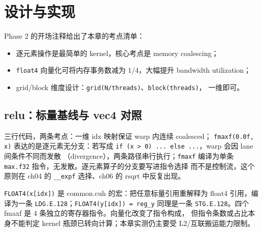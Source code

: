 \section{设计与实现}

Phase 2 的开场注释给出了本章的考点清单：

\begin{itemize}
\item 逐元素操作是最简单的 kernel，核心考点是 memory coalescing；
\item \texttt{float4} 向量化可将内存事务数减为 $1/4$，大幅提升 bandwidth
  utilization；
\item grid/block 维度设计：\texttt{grid(N/threads)}、\texttt{block(threads)}，
  一维即可。
\end{itemize}

\subsection{relu：标量基线与 vec4 对照}



三行代码，两条考点：一维 idx 映射保证 warp 内连续 coalesced；
\texttt{fmaxf(0.0f, x)} 表达的是逐元素无分支：若写成
\texttt{if (x > 0) ... else ...}，warp 会因 lane 间条件不同而发散
（divergence），两条路径串行执行；\texttt{fmaxf} 编译为单条
\texttt{max.f32} 指令，无发散。逐元素算子的分支要写进指令选择
而不是控制流，这个原则在 ch04 的 \texttt{\_\_expf} 选择、ch06 的
rsqrt 中反复出现。



\texttt{FLOAT4\allowbreak{}(x[idx])} 是 common.cuh 的宏：把任意标量引用重解释为
float4 引用，编译为一条 \texttt{LDG.E.128}；\texttt{FLOAT4\allowbreak{}(y[idx]) =\allowbreak{} reg\_\allowbreak{}y}
同理是一条 \texttt{STG.E.128}。四个 fmaxf 是 4 条独立的寄存器指令。向量化改变了指令构成，
但指令条数或占比本身不能判定 kernel 瓶颈已转向计算；本章实测仍主要受 L2/互联搬运能力限制。

